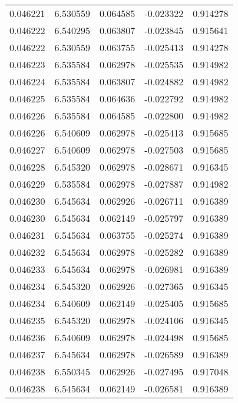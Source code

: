 \begin{tabular}{lrrrr}
0.046221    &  6.530559 &  0.064585 & -0.023322 &             0.914278 \\
0.046222    &  6.540295 &  0.063807 & -0.023845 &             0.915641 \\
0.046222    &  6.530559 &  0.063755 & -0.025413 &             0.914278 \\
0.046223    &  6.535584 &  0.062978 & -0.025535 &             0.914982 \\
0.046224    &  6.535584 &  0.063807 & -0.024882 &             0.914982 \\
0.046225    &  6.535584 &  0.064636 & -0.022792 &             0.914982 \\
0.046226    &  6.535584 &  0.064585 & -0.022800 &             0.914982 \\
0.046226    &  6.540609 &  0.062978 & -0.025413 &             0.915685 \\
0.046227    &  6.540609 &  0.062978 & -0.027503 &             0.915685 \\
0.046228    &  6.545320 &  0.062978 & -0.028671 &             0.916345 \\
0.046229    &  6.535584 &  0.062978 & -0.027887 &             0.914982 \\
0.046230    &  6.545634 &  0.062926 & -0.026711 &             0.916389 \\
0.046230    &  6.545634 &  0.062149 & -0.025797 &             0.916389 \\
0.046231    &  6.545634 &  0.063755 & -0.025274 &             0.916389 \\
0.046232    &  6.545634 &  0.062978 & -0.025282 &             0.916389 \\
0.046233    &  6.545634 &  0.062978 & -0.026981 &             0.916389 \\
0.046234    &  6.545320 &  0.062926 & -0.027365 &             0.916345 \\
0.046234    &  6.540609 &  0.062149 & -0.025405 &             0.915685 \\
0.046235    &  6.545320 &  0.062978 & -0.024106 &             0.916345 \\
0.046236    &  6.540609 &  0.062978 & -0.024498 &             0.915685 \\
0.046237    &  6.545634 &  0.062978 & -0.026589 &             0.916389 \\
0.046238    &  6.550345 &  0.062926 & -0.027495 &             0.917048 \\
0.046238    &  6.545634 &  0.062149 & -0.026581 &             0.916389 \\

\end{tabular}
